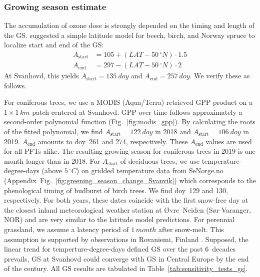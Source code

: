 \documentclass[bg, manuscript]{copernicus}
\begin{document}
\subsubsection{Growing season estimate}
\label{subsec:gs_est}

The accumulation of ozone dose is strongly depended on the timing and length of the GS. \citet{ICP:MappingManual2017} suggested a simple latitude model for beech, birch, and Norway spruce to localize start and end of the GS:
%
\begin{align}
  A_\mathrm{start} &= 105 + (LAT-50\,\unit{^\circ N})\cdot 1.5\\
  A_\mathrm{end} &= 297 - (LAT-50\,\unit{^\circ N})\cdot 2
\end{align}
%
At Svanhovd, this yields $A_\mathrm{start}=135~\unit{doy}$ and $A_\mathrm{end}=257~\unit{doy}$. We verify these as follows.

For coniferous trees, we use a MODIS (Aqua/Terra) retrieved GPP product \citep{MODIS_PSN} on a $1\times 1\,\unit{km}$ patch centered at Svanhovd. GPP over time follows approximately a second-order polynomial function (Fig.~\ref{fig:modis_gpp}). By calculating the roots of the fitted polynomial, we find $A_\text{start}=122~\unit{doy}$ in 2018 and $A_\text{start}=106~\unit{doy}$ in 2019. $A_\text{end}$ amounts to \unit{doy}~261 and 274, respectively. These $A_\mathrm{end}$ values are used for all PFTs alike. The resulting growing season for coniferous trees in 2019 is one month longer than in 2018. For $A_\text{start}$ of deciduous trees, we use temperature-degree-days (above $5\,\unit{^\circ C}$) on gridded temperature data from SeNorge.no (Appendix~Fig.~\ref{fig:greening_season_change_Svanvik}) which corresponds to the phenological timing of budburst of birch trees. We find \unit{doy}~129 and 130, respectively. For both years, these dates coincide with the first snow-free day at the closest inland meteorological weather station at Øvre~Neiden (Sør-Varanger, NOR) and are very similar to the latitude model predictions. For perennial grassland, we assume a latency period of $1\,\unit{month}$ after snow-melt. This assumption is supported by observations in Rovaniemi, Finland \citep[][Supplement~Fig.~S1]{FCR:Korhonen2018}. Supposed, the linear trend for temperture-degree-days defined GS over the past 6~decades prevails, GS at Svanhovd could converge with GS in Central Europe by the end of the century. All GS results are tabulated in Table~\ref{tab:sensitivity_tests_gs}.
\end{document}
